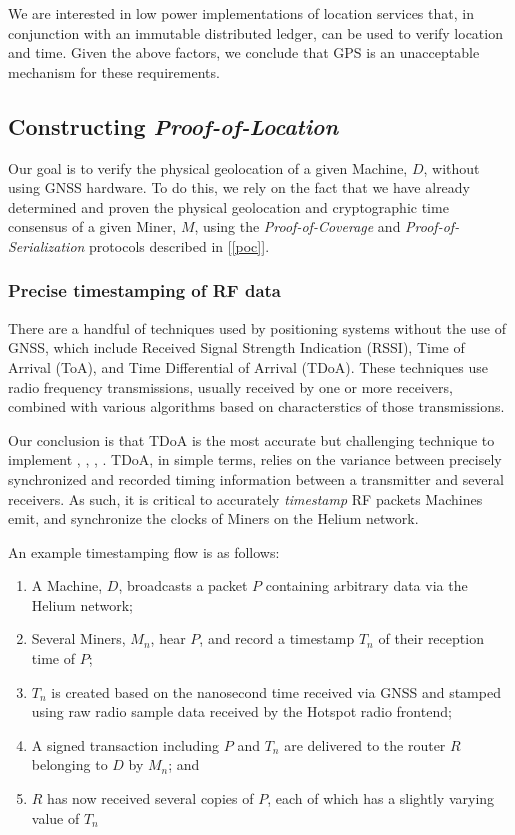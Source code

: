 \documentclass[10pt, nonatbib, nocopyrightspace, reprint]{sigplanconf}
\newcommand{\secref}[1]{[\autoref{#1}]}
\begin{document}
We are interested in low power implementations of location services that, in conjunction with an immutable distributed ledger, can be used to verify location and time. Given the above factors, we conclude that GPS is an unacceptable mechanism for these requirements.

\subsection{Constructing \emph{Proof-of-Location}}

Our goal is to verify the physical geolocation of a given Machine, $D$, without using GNSS hardware. To do this, we rely on the fact that we have already determined and proven the physical geolocation and cryptographic time consensus of a given Miner, $M$, using the \emph{Proof-of-Coverage} and \emph{Proof-of-Serialization} protocols described in \secref{poc}.

\subsubsection{Precise timestamping of RF data}

There are a handful of techniques used by positioning systems without the use of GNSS, which include Received Signal Strength Indication (RSSI), Time of Arrival (ToA), and Time Differential of Arrival (TDoA). These techniques use radio frequency transmissions, usually received by one or more receivers, combined with various algorithms based on characterstics of those transmissions.

Our conclusion is that TDoA is the most accurate but challenging technique to implement \cite{tdoavsrssi}, \cite{tdoavstoa}, \cite{wifipositioning}, \cite{locationestimation}. TDoA, in simple terms, relies on the variance between precisely synchronized and recorded timing information between a transmitter and several receivers. As such, it is critical to accurately \emph{timestamp} RF packets Machines emit, and synchronize the clocks of Miners on the Helium network.

An example timestamping flow is as follows:

\begin{enumerate}
  \item A Machine, $D$, broadcasts a packet $P$ containing arbitrary data via the Helium network;
  \item Several Miners, $M_n$, hear $P$, and record a timestamp $T_n$ of their reception time of $P$;
  \item $T_n$ is created based on the nanosecond time received via GNSS and stamped using raw radio sample data received by the Hotspot radio frontend;
  \item A signed transaction including $P$ and $T_n$ are delivered to the router $R$ belonging to $D$ by $M_n$; and
  \item $R$ has now received several copies of $P$, each of which has a slightly varying value of $T_n$
\end{enumerate}
\end{document}

